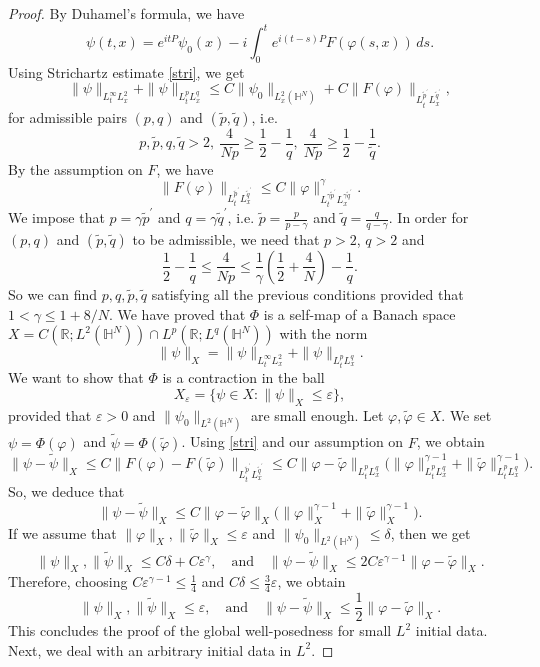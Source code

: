 \documentclass[10pt,leqno]{amsart}
\numberwithin{equation}{section}
\newcommand{\field}[1]{\mathbb{#1}}
\newcommand{\R}{\field{R}}          		%
\newcommand{\Hy}{\field{H}}
\begin{document}
\begin{proof}
By Duhamel's formula, we have
$$\psi(t,x)=e^{itP}\psi_0(x) -i\int_0^t e^{i(t-s)P} F(\varphi (s,x))\,ds.$$
Using Strichartz estimate \eqref{stri}, we get
$$\|\psi \|_{L_t^\infty  L_x^2  } +\|\psi \|_{L_t^p  L_x^q } \leq C \|\psi_0\|_{L_x^2 (\Hy^N)} +C \|F(\varphi)\|_{L_t^{\tilde{p}^\prime}  L_x^{\tilde{q}^\prime}},$$
for admissible pairs $(p,q)$ and $(\tilde{p},\tilde{q})$,  i.e.
$$p,\tilde{p}, q,\tilde{q}> 2,\ \dfrac{4}{Np}\geq \dfrac{1}{2} - \dfrac{1}{q},\ \dfrac{4}{N\tilde{p}}\geq \dfrac{1}{2} - \dfrac{1}{\tilde{q}}.$$
By the assumption on $F$, we have
$$\|F(\varphi )\|_{L_t^{\tilde{p}^\prime} L_x^{\tilde{q}^\prime}} \leq C \|\varphi\|^\gamma_{L_t^{\gamma\tilde{p}^\prime} L_x^{\gamma\tilde{q}^\prime}}. $$
We impose that $p=\gamma \tilde{p}^\prime$ and $q=\gamma \tilde{q}^\prime$, i.e. $\tilde{p} = \tfrac{p}{p-\gamma}$ and $\tilde{q} = \tfrac{q}{q-\gamma}$. In order for $(p,q)$ and $(\tilde{p},\tilde{q})$ to be admissible, we need that $p>2 $, $q>2$ and
$$\dfrac{1}{2} -\frac{1}{q} \leq \dfrac{4}{Np}\leq \dfrac{1}{\gamma} (\dfrac{1}{2}+\dfrac{4}{N})  -\dfrac{1}{q}. $$
So we can find $p,q,\tilde{p},\tilde{q}$ satisfying all the previous conditions provided that $1<\gamma \leq 1+8/N$. We have proved that $\Phi$ is a self-map of a Banach space $X=C(\R ;L^2 (\Hy^N))\cap L^p (\R ; L^q (\Hy^N))$ 
with the norm
$$\|\psi\|_X =\|\psi\|_{L_t^\infty L_x^2 } +\|\psi\|_{L_t^p L_x^q} .$$ 
We want to show that $\Phi$ is a contraction in the ball
$$X_\varepsilon = \{\psi\in X\colon \|\psi\|_X \leq \varepsilon \},$$
provided that $\varepsilon>0$ and $\|\psi_0\|_{L^2 (\Hy^N)}$ are small enough. Let $\varphi,\tilde{\varphi} \in X$. We set $\psi=\Phi(\varphi)$ and $\tilde{\psi}=\Phi (\tilde{\varphi})$. Using \eqref{stri} and our assumption on $F$, we obtain
$$\|\psi-\tilde{\psi}\|_X \leq C  \|F(\varphi)- F(\tilde{\varphi})\|_{L_t^{\tilde{p}^\prime} L_x^{\tilde{q}^\prime}}\leq C \|\varphi-\tilde{\varphi}\|_{L_t^p L_x^q} \big(\|\varphi\|^{\gamma-1}_{L_t^p L_x^q}+\|\tilde{\varphi}\|^{\gamma-1}_{L_t^p L_x^q} \big).$$
So, we deduce that
$$\|\psi-\tilde{\psi}\|_X \leq C \|\varphi-\tilde{\varphi}\|_X \big(\|\varphi\|_X^{\gamma -1} +\|\tilde{\varphi}\|_X^{\gamma -1} \big).$$
If we assume that $\|\varphi\|_X , \|\tilde{\varphi}\|_X \leq \varepsilon$ and $\|\psi_0\|_{L^2 (\Hy^N)}\leq \delta$, then we get
$$\|\psi\|_X , \|\tilde{\psi}\|_X\leq C\delta +C \varepsilon^\gamma,\quad\text{and}\quad \|\psi-\tilde{\psi}\|_X \leq 2C \varepsilon^{\gamma -1} \|\varphi- \tilde{\varphi}\|_X .$$
Therefore, choosing $C \varepsilon^{\gamma -1}\leq \tfrac{1}{4}$ and $C\delta \leq \tfrac{3}{4} \varepsilon$, we obtain
$$\|\psi\|_X, \|\tilde{\psi}\|_X \leq \varepsilon ,\quad\text{and}\quad \|\psi-\tilde{\psi}\|_X \leq \frac{1}{2} \|\varphi-\tilde{\varphi}\|_X .$$
This concludes the proof of the global well-posedness for small $L^2$ initial data. Next, we deal with an arbitrary initial data in $L^2$.


\end{proof}
\end{document}
